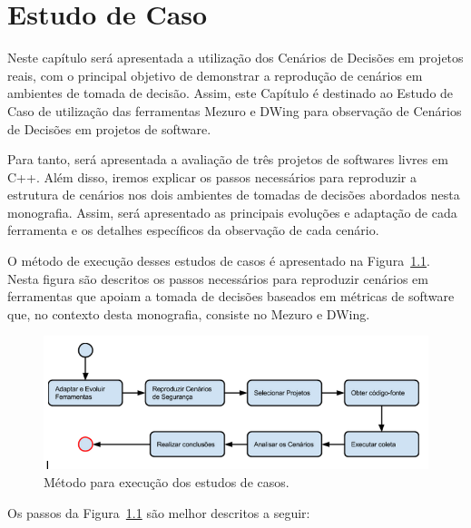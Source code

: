 \chapter{Estudo de Caso}
\label{cap-case-study}

%

Neste capítulo será apresentada a utilização dos Cenários de Decisões em projetos reais, com o principal objetivo de demonstrar a reprodução de cenários em ambientes de tomada de decisão. Assim, este Capítulo é destinado ao Estudo de Caso de utilização das ferramentas Mezuro e DWing para observação de Cenários de Decisões em projetos de software.

Para tanto, será apresentada a avaliação de três projetos de softwares livres em C++. Além disso, iremos explicar os passos necessários para reproduzir a estrutura de cenários nos dois ambientes de tomadas de decisões abordados nesta monografia. Assim, será apresentado as principais evoluções e adaptação de cada ferramenta e os detalhes específicos da observação de cada cenário.

O método de execução desses estudos de casos é apresentado na Figura~\ref{method}. Nesta figura são descritos os passos necessários para reproduzir cenários em ferramentas que apoiam a tomada de decisões baseados em métricas de software que, no contexto desta monografia, consiste no Mezuro e DWing.

\graphicspath{{figuras/}}
\begin{figure}[h]
\centering
\includegraphics[width=1.0\textwidth]{fluxograma}
\caption{Método para execução dos estudos de casos.}
\label{method}
\end{figure}

Os passos da Figura~\ref{method} são melhor descritos a seguir:


